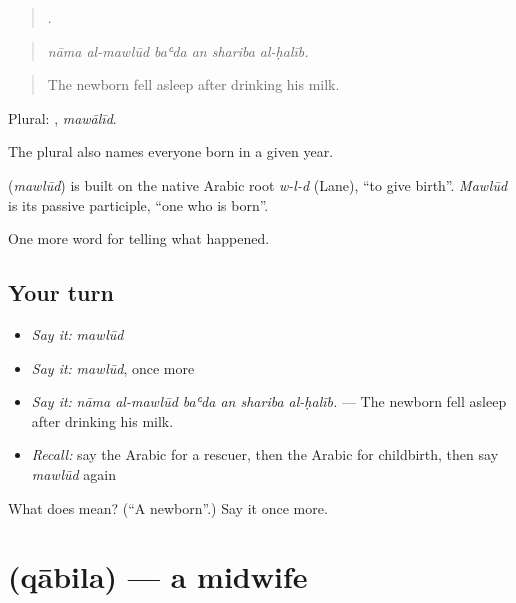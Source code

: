 \begin{quote}
     .
\end{quote}

\begin{quote}
\emph{nāma al-mawlūd baʿda an shariba al-ḥalīb.}
\end{quote}

\begin{quote}
The newborn fell asleep after drinking his milk.
\end{quote}

Plural: , \emph{mawālīd}.

The plural  also names everyone born in a given year.

\begin{cousinweb}
\textbf{} (\emph{mawlūd}) is built on the native Arabic root \emph{w-l-d} (Lane), \textquotedblleft{}to give birth\textquotedblright{}. \emph{Mawlūd} is its passive participle, \textquotedblleft{}one who is born\textquotedblright{}.
\end{cousinweb}

\begin{grammarlens}[title={What you've built}]
One more word for telling what happened.
\end{grammarlens}

\subsection*{Your turn}
\begin{itemize}
\raggedright
  \item \emph{Say it:} \emph{mawlūd}
  \item \emph{Say it:} \emph{mawlūd}, once more
  \item \emph{Say it:} \emph{nāma al-mawlūd baʿda an shariba al-ḥalīb.} — The newborn fell asleep after drinking his milk.
  \item \emph{Recall:} say the Arabic for a rescuer, then the Arabic for childbirth, then say \emph{mawlūd} again
\end{itemize}

\begin{tcolorbox}[breakable,colback=teal!4,colframe=teal!35!black,title={Before you move on}]
What does  mean? (\textquotedblleft{}A newborn\textquotedblright{}.) Say it once more.
\end{tcolorbox}
\section[\texorpdfstring{\ar{قابلة} (qābila)}{قابلة (qābila)}]{ (qābila) — a midwife}

